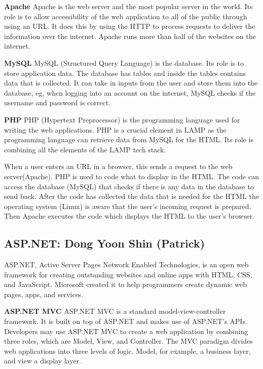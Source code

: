 \documentclass[a4paper, 11pt]{report}
\begin{document}
\textbf{Apache}
Apache is the web server and the most popular server in the world. Its role is to allow accessibility of the web application to all of the public through using an URL. It does this by using the HTTP to process requests to deliver the information over the internet. Apache runs more than half of the websites on the internet. 

\textbf{MySQL}
MySQL (Structured Query Language) is the database. Its role is to store application data. The database has tables and inside the tables contains data that is collected. It can take in inputs from the user and store them into the database, eg, when logging into an account on the internet, MySQL checks if the username and password is correct. 

\textbf{PHP}
PHP (Hypertext Preprocessor) is the programming language used for writing the web applications. PHP is a crucial element in LAMP as the programming language can retrieve data from MySQL for the HTML. Its role is combining all the elements of the LAMP tech stack. 

When a user enters an URL in a browser, this sends a request to the web server(Apache). PHP is used to code what to display in the HTML. The code can access the database (MySQL) that checks if there is any data in the database to send back. After the code has collected the data that is needed for the HTML the operating system (Linux) is aware that the user’s incoming request is prepared. Then Apache executes the code which displays the HTML to the user’s browser. 


\subsection{ASP.NET: Dong Yoon Shin (Patrick)}

  ASP.NET, Active Server Pages Network Enabled Technologies, is an open web framework for creating outstanding websites and online apps with HTML, CSS, and JavaScript. Microsoft created it to help programmers create dynamic web pages, apps, and services.

\textbf{ASP.NET MVC}
  ASP.NET MVC is a standard model-view-controller framework. It is built on top of ASP.NET and makes use of ASP.NET's APIs. Developers may use ASP.NET MVC to create a web application by combining three roles, which are Model, View, and Controller. The MVC paradigm divides web applications into three levels of logic. Model, for example, a business layer, and view a display layer.
\end{document}
